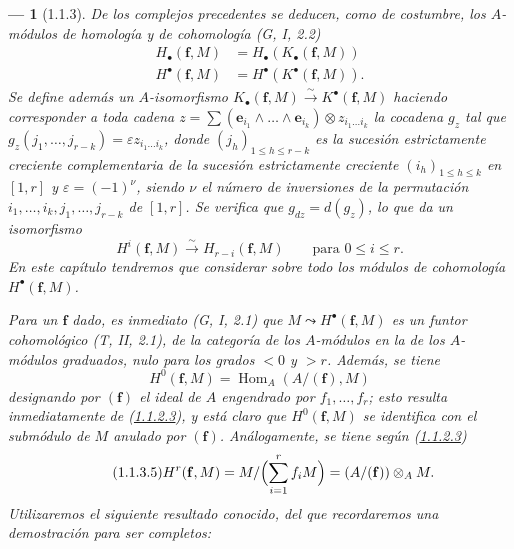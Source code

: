 \documentclass[10pt,oneside,openany]{book}
\theoremstyle{egaenv}\newtheorem*{env}{---}
\theoremstyle{egastatement}
\theoremstyle{egadescription}
\newcommand{\oldpage}[2][]{\marginnote{\normalfont\scriptsize\textbf{#1}\,|\,#2}\ignorespaces}
\renewcommand{\leq}{\leqslant}
\begin{document}
\oldpage[III]{83}

\begin{env}[1.1.3]
\label{III.1.1.3-fr}
De los complejos precedentes se deducen, como de costumbre, los \emph{$A$-módulos
de homología y de cohomología} (G, I, 2.2)
\begin{align}
\label{III.1.1.3.1-fr}
\tag{1.1.3.1}
H_\bullet(\mathbf f,M)&=H_\bullet(K_\bullet(\mathbf f,M))\\
\label{III.1.1.3.2-fr}
\tag{1.1.3.2}
H^\bullet(\mathbf f,M)&=H^\bullet(K^\bullet(\mathbf f,M)).
\end{align}
Se define además un $A$-\emph{isomorfismo}
$K_\bullet(\mathbf f,M)\xrightarrow{\sim}K^\bullet(\mathbf f,M)$ haciendo
corresponder a toda cadena
$z=\sum(\mathbf e_{i_1}\wedge\ldots\wedge\mathbf e_{i_k})\otimes
z_{i_1\ldots i_k}$ la cocadena $g_z$ tal que
$g_z(j_1,\ldots,j_{r-k})=\varepsilon z_{i_1\ldots i_k}$, donde
$(j_h)_{1\leq h\leq r-k}$ es la sucesión estrictamente creciente complementaria
de la sucesión estrictamente creciente $(i_h)_{1\leq h\leq k}$ en $[1,r]$ y
$\varepsilon=(-1)^\nu$, siendo $\nu$ el número de inversiones de la permutación
$i_1,\ldots,i_k,j_1,\ldots,j_{r-k}$ de $[1,r]$. Se verifica que
$g_{dz}=d(g_z)$, lo que da un isomorfismo
\begin{equation}
\label{III.1.1.3.3-fr}
\tag{1.1.3.3}
H^i(\mathbf f,M)\xrightarrow{\sim}H_{r-i}(\mathbf f,M)
\qquad\text{para }0\leq i\leq r.
\end{equation}
En este capítulo tendremos que considerar sobre todo los módulos de cohomología
$H^\bullet(\mathbf f,M)$.

Para un $\mathbf f$ dado, es inmediato (G, I, 2.1) que
$M\leadsto H^\bullet(\mathbf f,M)$ es un \emph{funtor cohomológico}
(T, II, 2.1), de la categoría de los $A$-módulos en la de los $A$-módulos
graduados, nulo para los grados $<0$ y $>r$. Además, se tiene
\begin{equation}
\label{III.1.1.3.4-fr}
\tag{1.1.3.4}
H^0(\mathbf f,M)=\operatorname{Hom}_A(A/(\mathbf f),M)
\end{equation}
designando por $(\mathbf f)$ el ideal de $A$ engendrado por
$f_1,\ldots,f_r$; esto resulta inmediatamente de
(\hyperref[III.1.1.2.3-fr]{1.1.2.3}), y está claro que
$H^0(\mathbf f,M)$ se identifica con el submódulo de $M$ \emph{anulado por
$(\mathbf f)$}. Análogamente, se tiene según
(\hyperref[III.1.1.2.3-fr]{1.1.2.3})
\begin{equation}
\label{III.1.1.3.5-fr}
\tag{1.1.3.5}
H^r(\mathbf f,M)=M/\Bigl(\sum_{i=1}^r f_iM\Bigr)
=(A/(\mathbf f))\otimes_A M.
\end{equation}
Utilizaremos el siguiente resultado conocido, del que recordaremos una
demostración para ser completos:
\end{env}
\end{document}
